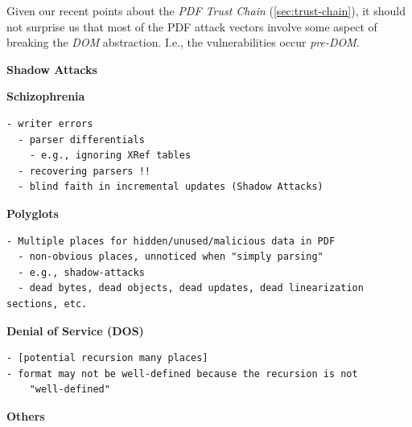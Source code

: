 Given our recent points about the \emph{PDF Trust Chain}
(\cref{sec:trust-chain}),
it should not surprise us that most of the PDF attack vectors
involve some aspect of breaking the \emph{DOM} abstraction.
I.e., the vulnerabilities occur \emph{pre-DOM}.

{\bf{Shadow Attacks}} 

{\bf{Schizophrenia}} 
\begin{lstlisting}[style=meta]
  - writer errors
  - parser differentials
    - e.g., ignoring XRef tables
  - recovering parsers !!
  - blind faith in incremental updates (Shadow Attacks)
\end{lstlisting}

{\bf{Polyglots}} 
\begin{lstlisting}[style=meta]
- Multiple places for hidden/unused/malicious data in PDF
  - non-obvious places, unnoticed when "simply parsing"
  - e.g., shadow-attacks
  - dead bytes, dead objects, dead updates, dead linearization sections, etc.
\end{lstlisting}

{\bf{Denial of Service (DOS)}} 
%
\begin{lstlisting}[style=meta]
- [potential recursion many places]
- format may not be well-defined because the recursion is not
    "well-defined"
\end{lstlisting}


{\bf{Others}} 

